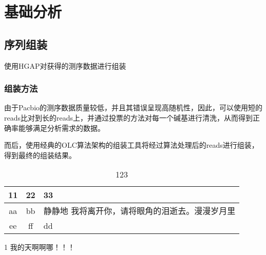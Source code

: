 \documentclass[UTF8,a4paper,sub3section]{ctexart}
\let\stdsection\section
\renewcommand\section{\newpage\stdsection}
\begin{document}
\maketitle
\thispagestyle{empty}
\newpage

\pagestyle{plain}
\setcounter{page}{1}
\tableofcontents
\newpage

\setcounter{page}{1}
\pagestyle{fancy}

\section{基础分析}
\subsection{序列组装}
使用HGAP对获得的测序数据进行组装
\subsubsection{组装方法}
由于Pacbio的测序数据质量较低，并且其错误呈现高随机性，因此，可以使用短的reads比对到长的reads上，并通过投票的方法对每一个碱基进行清洗，从而得到正确率能够满足分析需求的数据\cite{HGAP}。


而后，使用经典的OLC算法架构的组装工具将经过算法处理后的reads进行组装，得到最终的组装结果。










\begin{table}[H]
    \caption{123}
        \begin{center}
            \begin{threeparttable}
                \begin{tabularx}{\textwidth}{cc|X}

                    \toprule
                    11&22&33\\
                    \midrule
                    aa&bb&静静地 \tnote{1} 我将离开你，请将眼角的泪逝去。漫漫岁月里\\

                    ee&ff&dd\\
                    \bottomrule

                \end{tabularx}
                \begin{tablenotes}

                    \footnotesize
                    \item[1] 我的天啊啊哪！！！
                \end{tablenotes}
            \end{threeparttable}
        \end{center}
\end{table}


\end{document}
